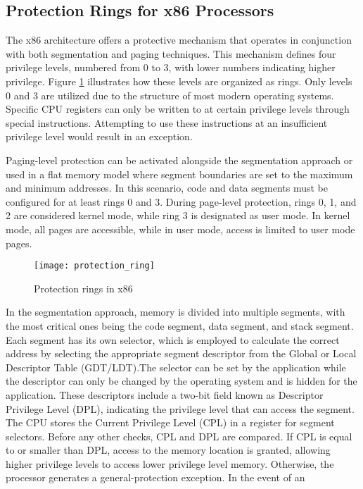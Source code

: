 \subsection{Protection Rings for x86 Processors}
The x86 architecture offers a protective mechanism that operates in conjunction
with both segmentation and paging techniques\cite{Intel}. This mechanism defines four
privilege levels, numbered from 0 to 3, with lower numbers indicating higher
privilege. Figure \ref{fig:x86} illustrates how these levels are organized as rings.
Only levels 0 and 3 are utilized due to the structure of most modern operating
systems. Specific CPU registers can only be written to at certain privilege
levels through special instructions. Attempting to use these instructions at an
insufficient privilege level would result in an exception.\par
Paging-level protection can be activated alongside the  segmentation approach or used in a
flat memory model where segment boundaries are set to the maximum and minimum
addresses. In this scenario, code and data segments must be configured for at
least rings 0 and 3. During page-level protection, rings 0, 1, and 2 are
considered kernel mode, while ring 3 is designated as user mode. In kernel mode,
all pages are accessible, while in user mode, access is limited to user mode
pages.\par
\begin{figure}[h]
    \centering
    \texttt{[image: protection\_ring]}
    \caption{Protection rings in x86}
    \label{fig:x86}
\end{figure}
In the segmentation approach, memory is divided into multiple segments, with the
most critical ones being the code segment, data segment, and stack segment. Each
segment has its own selector, which is employed to calculate the correct address
by selecting the appropriate segment descriptor from the Global or Local
Descriptor Table (GDT/LDT).The selector can be set by the application while the
descriptor can only be changed by the operating system and is hidden for the
application. These descriptors include a two-bit field known as
Descriptor Privilege Level (DPL), indicating the privilege level that can access
the segment. The CPU stores the Current Privilege Level (CPL) in a register for
segment selectors. Before any other checks, CPL and DPL are compared. If CPL is
equal to or smaller than DPL, access to the memory location is granted, allowing
higher privilege levels to access lower privilege level memory. Otherwise, the
processor generates a general-protection exception. In the event of an
